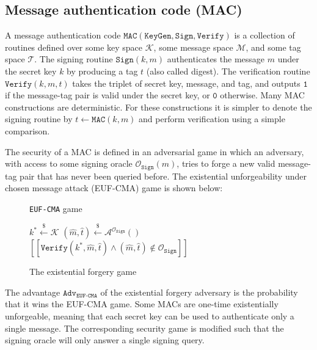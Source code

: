 \documentclass[journal=tches,submission]{iacrtrans}
\newcommand{\keygen}{\texttt{KeyGen}}
\newcommand{\mac}{\texttt{MAC}}
\newcommand{\sign}{\texttt{Sign}}
\newcommand{\verify}{\texttt{Verify}}
\newcommand{\leftsample}{\stackrel{\$}{\leftarrow}}
\newcommand{\llbrack}{[\![}
\newcommand{\rrbrack}{]\!]}
\newcommand{\adv}{\texttt{Adv}}
\begin{document}
\subsection{Message authentication code (MAC)}\label{sec:message-authentication-code}
A message authentication code $\mac(\keygen, \sign, \verify)$ is a collection of routines defined over some key space $\mathcal{K}$, some message space $\mathcal{M}$, and some tag space $\mathcal{T}$. The signing routine $\sign(k, m)$ authenticates the message $m$ under the secret key $k$ by producing a tag $t$ (also called digest). The verification routine $\verify(k, m, t)$ takes the triplet of secret key, message, and tag, and outputs $\texttt{1}$ if the message-tag pair is valid under the secret key, or $\texttt{0}$ otherwise. Many MAC constructions are deterministic. For these constructions it is simpler to denote the signing routine by $t \leftarrow \mac(k, m)$ and perform verification using a simple comparison.

The security of a MAC is defined in an adversarial game in which an adversary, with access to some signing oracle $\mathcal{O}_\sign(m)$, tries to forge a new valid message-tag pair that has never been queried before. The existential unforgeability under chosen message attack (EUF-CMA) game is shown below:

\begin{figure}[H]
    \centering
    \begin{minipage}{0.53\textwidth}
        \begin{algorithm}[H]
            \caption*{\texttt{EUF-CMA} game}
            \begin{algorithmic}[1]
                \State $k^\ast \leftsample \mathcal{K}$
                \State $(\hat{m}, \hat{t}) \leftsample \mathcal{A}^{\mathcal{O}_\sign}()$
                \State \Return $
                    \llbrack \verify(k^\ast, \hat{m}, \hat{t}) 
                    \land (\hat{m}, \hat{t}) \not\in \mathcal{O}_\sign
                    \rrbrack
                $
            \end{algorithmic}
        \end{algorithm}
    \end{minipage}
    \caption{The existential forgery game}\label{fig:euf-cma-game}
\end{figure}

The advantage $\adv_\texttt{EUF-CMA}$ of the existential forgery adversary is the probability that it wins the EUF-CMA game. Some MACs are one-time existentially unforgeable, meaning that each secret key can be used to authenticate only a single message. The corresponding security game is modified such that the signing oracle will only answer a single signing query.
\end{document}
